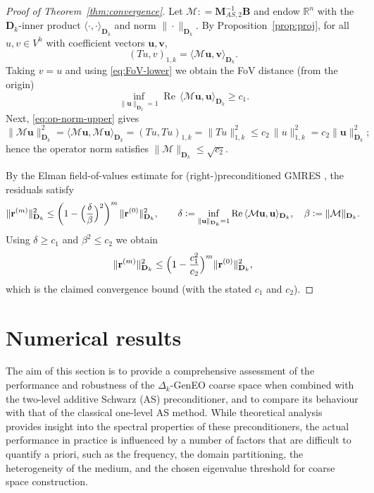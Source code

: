 \documentclass[preprint,3p,times]{elsarticle}
\newcommand{\assign}{\mathrel{\mathop:}=}
\theoremstyle{definition}
\numberwithin{equation}{section}
\begin{document}
\begin{proof}[Proof of Theorem~\ref{thm:convergence}]
Let $\mathcal{M}\assign\mathbf{M}_{AS,2}^{-1}\mathbf{B}$ and endow $\mathbb{R}^n$ with the
$\mathbf{D}_k$-inner product $\langle\cdot,\cdot\rangle_{\mathbf D_k}$ and norm
$\|\cdot\|_{\mathbf D_k}$.  By Proposition~\ref{prop:proj}, for all $u,v\in V^h$ with
coefficient vectors $\mathbf u,\mathbf v$,
\[
	(Tu,v)_{1, k} = \langle \mathcal{M}\mathbf u,\mathbf v\rangle_{\mathbf D_k}.
\]
Taking $v=u$ and using \eqref{eq:FoV-lower} we obtain the FoV distance (from the origin)
\[
	\inf_{\|\mathbf u\|_{\mathbf D_k}=1}\operatorname{Re}\,\langle \mathcal{M}\mathbf u,\mathbf u\rangle_{\mathbf D_k}
	\ge c_1.
\]
Next, \eqref{eq:op-norm-upper} gives
\[
	\|\mathcal{M}\mathbf u\|_{\mathbf D_k}^2
	= \langle \mathcal{M}\mathbf u,\mathcal{M}\mathbf u\rangle_{\mathbf D_k}
	= (Tu,Tu)_{1, k} =\|Tu\|_{1, k}^2
	\le c_2\,\|u\|_{1, k}^2
	= c_2\|\mathbf u\|_{\mathbf D_k}^2;
\]
hence the operator norm satisfies $\|\mathcal{M}\|_{\mathbf D_k}\le \sqrt{c_2}$.

By the Elman field-of-values estimate for (right-)preconditioned GMRES
\cite{Elman:1983:VIM}, the residuals satisfy
\[
	\|\mathbf r^{(m)}\|_{\mathbf D_k}^2
	\le
	\biggl(1-\Bigl(\frac{\delta}{\beta}\Bigr)^2\biggr)^{m}\,\|\mathbf r^{(0)}\|_{\mathbf D_k}^2,
	\qquad
	\delta\assign\inf_{\|\mathbf u\|_{\mathbf D_k}=1}\operatorname{Re}\,\langle \mathcal{M}\mathbf u,\mathbf u\rangle_{\mathbf D_k},\quad
	\beta\assign\|\mathcal{M}\|_{\mathbf D_k}.
\]
Using $\delta\ge c_1$ and $\beta^2\le c_2$ we obtain
\[
	\|\mathbf r^{(m)}\|_{\mathbf D_k}^2
	\le
	\Bigl(1-\frac{c_1^2}{c_2}\Bigr)^{m}\|\mathbf r^{(0)}\|_{\mathbf D_k}^2,
\]
which is the claimed convergence bound (with the stated $c_1$ and $c_2$).
\end{proof}





\section{Numerical results} 
\label{sec:numerics}
The aim of this section is to provide a comprehensive assessment of the performance and robustness 
of the $\Delta_k$-GenEO coarse space when combined with the two-level additive Schwarz (AS) preconditioner, 
and to compare its behaviour with that of the classical one-level AS method. 
While theoretical analysis provides insight into the spectral properties of these preconditioners, 
the actual performance in practice is influenced by a number of factors that are difficult to quantify a priori, 
such as the frequency, the domain partitioning, the heterogeneity of the medium, and the chosen eigenvalue threshold for coarse space construction.  
\end{document}
